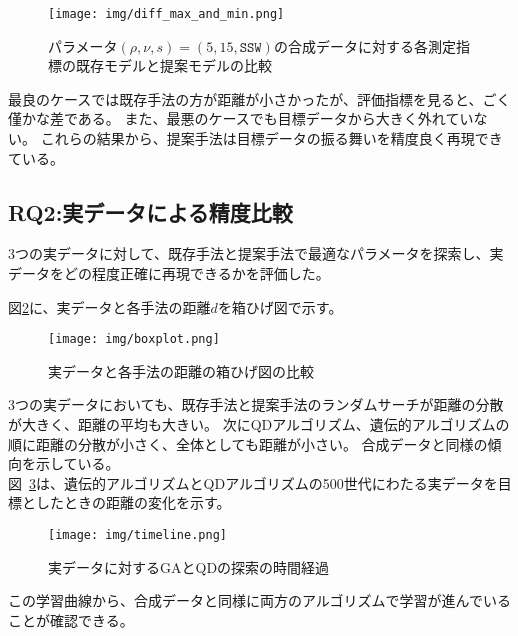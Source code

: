 \documentclass[uplatex,11pt,openany]{ujreport}
\begin{document}
            \begin{figure}[H]
                \centering
                \texttt{[image: img/diff\_max\_and\_min.png]}
                \caption{パラメータ$(\rho,\nu,s)=(5,15,\texttt{SSW})$の合成データに対する各測定指標の既存モデルと提案モデルの比較}
                \label{fig:radar_chart_synthetic}
            \end{figure}

            最良のケースでは既存手法の方が距離が小さかったが、評価指標を見ると、ごく僅かな差である。
            また、最悪のケースでも目標データから大きく外れていない。
            これらの結果から、提案手法は目標データの振る舞いを精度良く再現できている。


        \subsection{RQ2:実データによる精度比較}
            3つの実データに対して、既存手法と提案手法で最適なパラメータを探索し、実データをどの程度正確に再現できるかを評価した。

            図\ref{fig:boxplot}に、実データと各手法の距離$d$を箱ひげ図で示す。
            \begin{figure}[H]
                \centering
                \texttt{[image: img/boxplot.png]}
                \caption{実データと各手法の距離の箱ひげ図の比較}
                \label{fig:boxplot}
            \end{figure}

            3つの実データにおいても、既存手法と提案手法のランダムサーチが距離の分散が大きく、距離の平均も大きい。
            次にQDアルゴリズム、遺伝的アルゴリズムの順に距離の分散が小さく、全体としても距離が小さい。
            合成データと同様の傾向を示している。\\


            図~\ref{fig:timeline}は、遺伝的アルゴリズムとQDアルゴリズムの500世代にわたる実データを目標としたときの距離の変化を示す。
            \begin{figure}[H]
                \centering
                \texttt{[image: img/timeline.png]}
                \caption{実データに対するGAとQDの探索の時間経過}
                \label{fig:timeline}
            \end{figure}
            この学習曲線から、合成データと同様に両方のアルゴリズムで学習が進んでいることが確認できる。\\
\end{document}
